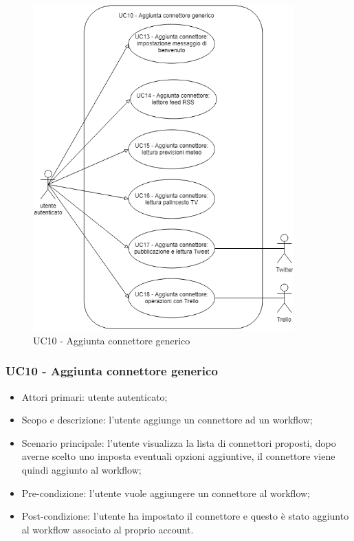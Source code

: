\begin{figure}[H]
	\centering
	\includegraphics[width=10cm,keepaspectratio]{../includes/pics/aggiunta_connettore_generico.png}
	\caption{\label{fig:mission}UC10 - Aggiunta connettore generico}
\end{figure}

\subsubsection{UC10 - Aggiunta connettore generico}
\begin{itemize}
	\item  Attori primari: utente autenticato;
	\item  Scopo e descrizione: l'utente aggiunge un connettore ad un workflow;
	\item  Scenario principale: l'utente visualizza la lista di connettori proposti, dopo averne scelto uno imposta eventuali opzioni aggiuntive, il connettore viene quindi aggiunto al workflow;
	\item  Pre-condizione: l'utente vuole aggiungere un connettore al workflow;
	\item  Post-condizione: l'utente ha impostato il connettore e questo è stato aggiunto al workflow associato al proprio account.
\end{itemize}
